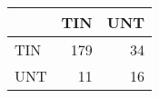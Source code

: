 \begin{tabular}{lrr}
\hline
     &   TIN &   UNT \\
\hline
 TIN &   179 &    34 \\
 UNT &    11 &    16 \\
\hline
\end{tabular}
